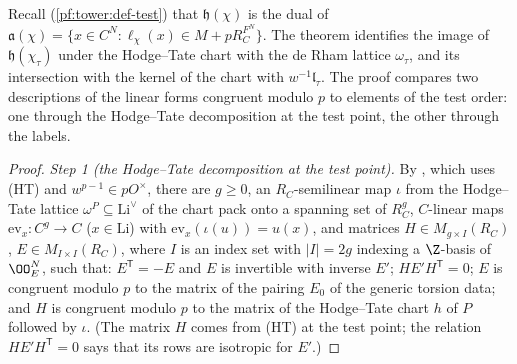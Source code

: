 Recall (\cref{pf:tower:def-test}) that $\mathfrak h(\chi)$ is the dual of
$\mathfrak a(\chi)=\{x\in C^N:\ell_\chi(x)\in M+pR_C^{F^N}\}$. The theorem identifies the image of $\mathfrak h(\chi_\tau)$
under the Hodge--Tate chart with the de Rham lattice $\omega_\tau$, and its intersection with the kernel of the chart with
$w^{-1}\mathfrak l_\tau$. The proof compares two descriptions of the linear forms congruent modulo $p$ to elements of the test
order: one through the Hodge--Tate decomposition at the test point, the other through the labels.

\begin{proof}
\emph{Step 1 (the Hodge--Tate decomposition at the test point).} By
, which uses (HT) and $w^{p-1}\in pO^\times$, there are $g\ge0$, an
$R_C$-semilinear map $\iota$ from the Hodge--Tate lattice $\omega^P\subseteq\mathrm{Li}^\vee$ of the chart pack onto a spanning
set of $R_C^g$, $C$-linear maps $\mathrm{ev}_x\colon C^g\to C$ ($x\in\mathrm{Li}$) with $\mathrm{ev}_x(\iota(u))=u(x)$, and
matrices $H\in M_{g\times I}(R_C)$, $E\in M_{I\times I}(R_C)$, where $I$ is an index set with $|I|=2g$ indexing a $\Z$-basis of
$\OO_E^N$, such that: $E^{\mathsf T}=-E$ and $E$ is invertible with inverse $E'$; $HE'H^{\mathsf T}=0$; $E$ is congruent modulo
$p$ to the matrix of the pairing $E_0$ of the generic torsion data; and $H$ is congruent modulo $p$ to the matrix of the
Hodge--Tate chart $h$ of $P$ followed by $\iota$. (The matrix $H$ comes from (HT) at the test point; the relation
$HE'H^{\mathsf T}=0$ says that its rows are isotropic for $E'$.)


\end{proof}
